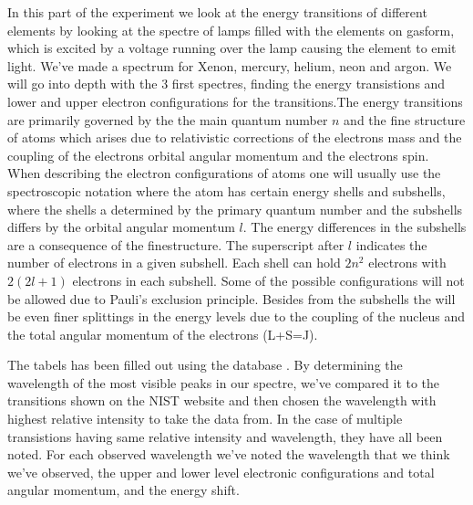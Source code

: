 In this part of the experiment we look at the energy transitions of different elements by looking at the spectre of lamps filled with the elements on gasform, which is excited by a voltage running over the lamp causing the element to emit light. We've made a spectrum for Xenon, mercury, helium, neon and argon. We will go into depth with the 3 first spectres, finding the energy transistions and lower and upper  electron configurations for the transitions.The energy transitions are primarily governed by the the main quantum number $n$ and the fine structure of atoms which arises due to relativistic corrections of the electrons mass and the coupling of the electrons orbital angular momentum and the electrons spin.\\
 When describing the electron configurations of atoms one will usually use the spectroscopic notation where the atom has certain energy shells and subshells, where the shells a determined by the primary quantum number and the subshells differs by the orbital angular momentum $l$. The energy differences in the subshells are a consequence of the finestructure. The superscript after $l$ indicates the number of electrons in a given subshell. Each shell can hold $2n^2$ electrons with $2(2l+1)$ electrons in each subshell. Some of the possible configurations will not be allowed due to Pauli's exclusion principle. Besides from the subshells the will be even finer splittings in the energy levels due to the coupling of the nucleus and the total angular momentum of the electrons (L+S=J). 
 
The tabels has been filled out using the database . By determining the wavelength of the most visible peaks in our spectre, we've compared it to the transitions shown on the NIST website and then chosen the wavelength with highest relative intensity to take the data from. In the case of multiple transistions having same relative intensity and wavelength, they have all been noted. For each observed wavelength we've noted the wavelength that we think we've observed, the upper and lower level electronic configurations and total angular momentum, and the energy shift. 




